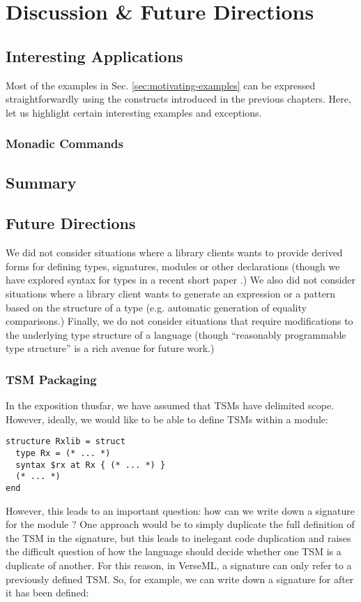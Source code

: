 \chapter{Discussion \& Future Directions}\label{chap:conclusion}
\section{Interesting Applications}
Most of the examples in Sec. \ref{sec:motivating-examples} can be expressed straightforwardly using the constructs introduced in the previous chapters. Here, let us highlight certain interesting examples and exceptions.

\subsection{Monadic Commands}\label{sec:application-monadic-commands}

\section{Summary}

\section{Future Directions}\label{sec:future-work}
We did not consider situations where a library clients wants to provide derived forms for defining types, signatures, modules or other declarations (though we have explored syntax for types in a recent short paper \cite{sac15}.) We also did not consider situations where a library client wants to generate an expression or a pattern based on the structure of a type (e.g. automatic generation of equality comparisons.) Finally, we do not consider situations that require modifications to the underlying type structure of a language (though ``reasonably programmable type structure'' is a rich avenue for future work.)

\subsection{TSM Packaging}\label{sec:tsm-packaging}

In the exposition thusfar, we have assumed that TSMs have delimited scope. However, ideally, we would like to be able to define TSMs within a module:
\begin{lstlisting}[numbers=none]
structure Rxlib = struct 
  type Rx = (* ... *)
  syntax $rx at Rx { (* ... *) }
  (* ... *)
end
\end{lstlisting}
However, this leads to an important question: how can we write down a signature for the module ? One approach would be to simply duplicate the full definition of the TSM in the signature, but this leads to inelegant code duplication and raises the difficult question of how the language should decide whether one TSM is a duplicate of another. For this reason, in VerseML, a signature can only refer to a previously defined TSM. So, for example, we can write down a signature for  after it has been defined:

